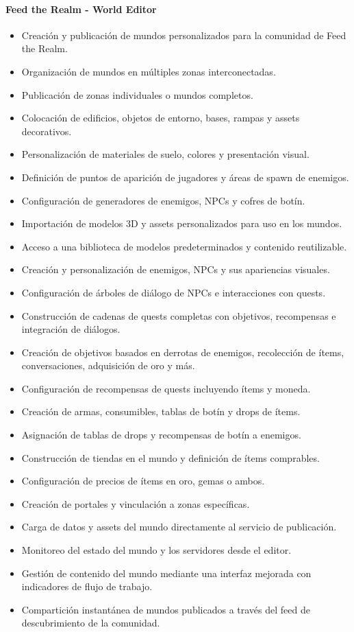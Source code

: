 \paragraph{Feed the Realm - World Editor}
\begin{itemize}
  \item Creación y publicación de mundos personalizados para la comunidad de Feed the Realm.
  \item Organización de mundos en múltiples zonas interconectadas.
  \item Publicación de zonas individuales o mundos completos.
  \item Colocación de edificios, objetos de entorno, bases, rampas y assets decorativos.
  \item Personalización de materiales de suelo, colores y presentación visual.
  \item Definición de puntos de aparición de jugadores y áreas de spawn de enemigos.
  \item Configuración de generadores de enemigos, NPCs y cofres de botín.
  \item Importación de modelos 3D y assets personalizados para uso en los mundos.
  \item Acceso a una biblioteca de modelos predeterminados y contenido reutilizable.
  \item Creación y personalización de enemigos, NPCs y sus apariencias visuales.
  \item Configuración de árboles de diálogo de NPCs e interacciones con quests.
  \item Construcción de cadenas de quests completas con objetivos, recompensas e integración de diálogos.
  \item Creación de objetivos basados en derrotas de enemigos, recolección de ítems, conversaciones, adquisición de oro y más.
  \item Configuración de recompensas de quests incluyendo ítems y moneda.
  \item Creación de armas, consumibles, tablas de botín y drops de ítems.
  \item Asignación de tablas de drops y recompensas de botín a enemigos.
  \item Construcción de tiendas en el mundo y definición de ítems comprables.
  \item Configuración de precios de ítems en oro, gemas o ambos.
  \item Creación de portales y vinculación a zonas específicas.
  \item Carga de datos y assets del mundo directamente al servicio de publicación.
  \item Monitoreo del estado del mundo y los servidores desde el editor.
  \item Gestión de contenido del mundo mediante una interfaz mejorada con indicadores de flujo de trabajo.
  \item Compartición instantánea de mundos publicados a través del feed de descubrimiento de la comunidad.
\end{itemize}

